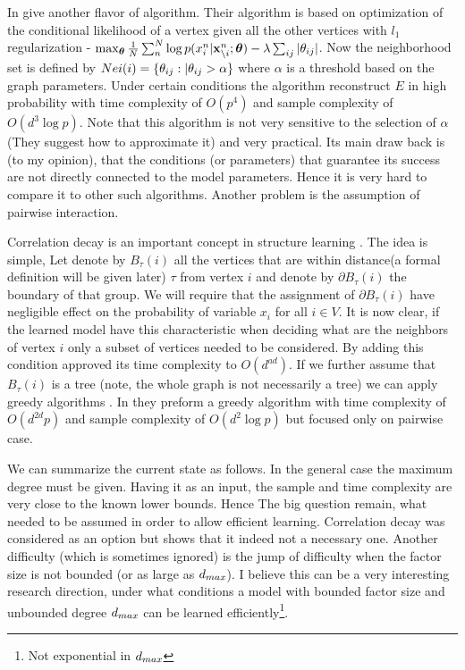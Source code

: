 In \cite{ravikumar2010high} give another flavor of algorithm. Their algorithm is based on optimization of the conditional likelihood of a vertex given all the other vertices with $l_1$ regularization - $\max_{\boldsymbol{\theta}} \frac{1}{N}\sum_n^N \log p(x^n_i| {\bf x}^n_{\setminus i};\boldsymbol{\theta}) - \lambda \sum_{ij} |\theta_{ij}|$. Now the neighborhood set is defined by $Nei(i) = \{\theta_{ij} : |\theta_{ij} > \alpha\}$ where $\alpha$ is a threshold based on the graph parameters. Under certain conditions the algorithm reconstruct $E$ in high probability with time complexity of $O(p^4)$  and sample complexity of $O( d^3 \log p)$. Note that this algorithm is not very sensitive to the selection of $\alpha$ (They suggest how to approximate it) and very practical. Its main draw back is (to my opinion), that the conditions (or parameters) that guarantee its success are not directly connected to the model parameters. Hence it is very hard to compare it to other such algorithms. Another problem is the assumption of pairwise interaction.     

Correlation decay is an important concept in structure learning \cite{montanari2009graphical}. The idea is simple, Let denote by $B_{\tau}(i)$ all the vertices that are within distance(a formal definition will be given later) $\tau$ from vertex $i$ and denote by $\partial B_{\tau}(i)$ the boundary of that group. We will require that the assignment of $\partial B_{\tau}(i)$ have negligible effect on the probability of variable $x_i$ for all $i \in V$. It is now clear, if the learned model have this characteristic when deciding what are the neighbors of vertex $i$ only a subset of vertices needed to be considered. By adding this condition \cite{bresler2008reconstruction} approved its time complexity to $O(d^{ad})$. If we further assume that $B_{\tau}(i)$ is a tree (note, the whole graph is not necessarily a tree) we can apply greedy algorithms \cite{netrapalli2010greedy, anandkumar2013learning}. In \cite{anandkumar2013learning} they preform a greedy algorithm with time complexity of $O(d^{2d}p)$ and sample complexity of $O(d^2\log p)$ but focused only on pairwise case.  

We can summarize the current state as follows. 
In the general case the maximum degree must be given. Having it as an input, the sample and time complexity are very close to the known lower bounds. 
Hence The big question remain, what needed to be assumed in order to allow efficient learning. 
Correlation decay was considered as an option\cite{montanari2009graphical} but \cite{bresler2014structure} shows that it indeed not a necessary one. 
Another difficulty (which is sometimes ignored) is the jump of difficulty when the factor size is not bounded (or as large as $d_{max}$). 
I believe this can be a very interesting research direction, under what conditions  a model with bounded factor size and unbounded degree $d_{max}$ can be learned efficiently\footnote{Not exponential in $d_{max}$}.
